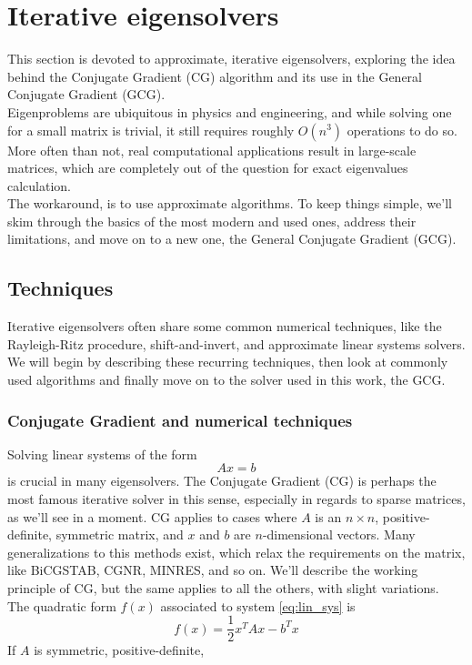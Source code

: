 \section{Iterative eigensolvers}
This section is devoted to approximate, iterative eigensolvers, exploring the idea behind the Conjugate Gradient (CG) algorithm and its use in the General Conjugate Gradient (GCG).
\\Eigenproblems are ubiquitous in physics and engineering, and while solving one for a small matrix is trivial, it still requires roughly $O(n^3)$ \cite{golub13} operations to do so. More often than not, real computational applications result in large-scale matrices, which are completely out of the question for exact eigenvalues calculation.
\\The workaround, is to use approximate algorithms. To keep things simple, we'll skim through the basics of the most modern and used ones, address their limitations, and move on to a new one, the General Conjugate Gradient (GCG).
\subsection{Techniques}
Iterative eigensolvers often share some common numerical techniques, like the Rayleigh-Ritz procedure, shift-and-invert, and approximate linear systems solvers. 
We will begin by describing these recurring techniques, then look at commonly used algorithms and finally move on to the solver used in this work, the GCG.
\subsubsection{Conjugate Gradient and numerical techniques}
Solving linear systems of the form
\begin{equation}
    \label{eq:lin_sys}
    Ax = b
\end{equation}
is crucial in many eigensolvers. The Conjugate Gradient (CG) is perhaps the most famous iterative solver in this sense, especially in regards to sparse matrices, as we'll see in a moment.
CG applies to cases where $A$ is an $n\times n$, positive-definite, symmetric matrix, and $x$ and $b$ are $n$-dimensional vectors.
Many generalizations to this methods exist, which relax the requirements on the matrix, like BiCGSTAB, CGNR, MINRES, and so on. We'll describe the working principle of CG, but the same applies to all the others, with slight variations.
\\The quadratic form $f(x)$ associated to system \ref{eq:lin_sys} is
\begin{equation}
    \label{eq:quad_form}
    f(x) = \frac 1 2 x^T A x - b^T x
\end{equation}
If $A$ is symmetric, positive-definite, 
